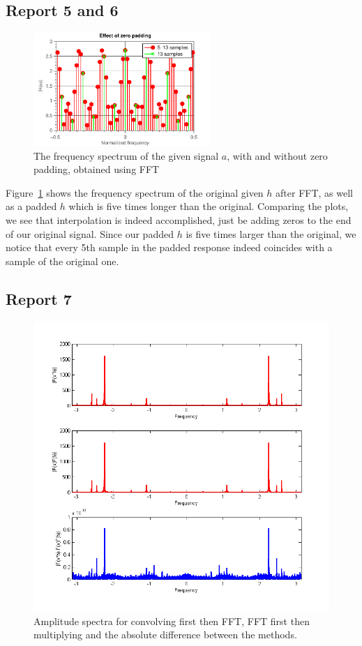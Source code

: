 \documentclass[11pt,titlepage]{report}
\begin{document}
\subsection{Report 5 and 6}

\begin{figure}[H]
	\centering
	\includegraphics[width=0.6\textwidth]{../../deliverable-7-resources/figures/ass-1/report-5-6/ass-1-report-5-6.pdf}
	\caption{The frequency spectrum of the given signal $a$, with and without zero padding, obtained using FFT}
	\label{fig:rep5-6-spectrum}
\end{figure}

Figure~\ref{fig:rep5-6-spectrum} shows the frequency spectrum of the original given $h$ after FFT, as well as a padded $h$ which is five times longer than the original. Comparing the plots, we see that interpolation is indeed accomplished, just be adding zeros to the end of our original signal. Since our padded $h$ is five times larger than the original, we notice that every 5th sample in the padded response indeed coincides with a sample of the original one.

\subsection{Report 7}

\begin{figure}[H]
	\centering
	\includegraphics[width=0.8\linewidth]{../../deliverable-7-resources/figures/ass-1/report-7/ass-1-report-7-temp.png}
	\caption{Amplitude spectra for convolving first then FFT, FFT first then multiplying and the absolute difference between the methods.}
	\label{fig:rep7}
\end{figure}
\end{document}
